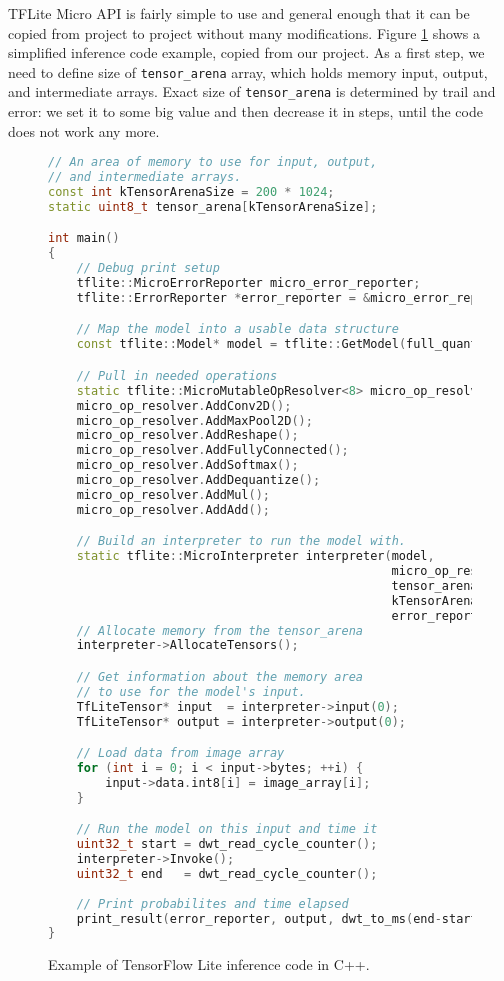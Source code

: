 TFLite Micro API is fairly simple to use and general enough that it can be copied from project to project without many modifications.
Figure \ref{inference_code} shows a simplified inference code example, copied from our project.
As a first step, we need to define size of \verb|tensor_arena| array, which holds memory input, output, and intermediate arrays.
Exact size of \verb|tensor_arena| is determined by trail and error: we set it to some big value and then decrease it in steps, until the code does not work any more.
\clearpage
\lstset{style=mystyle}
\begin{figure}[ht] 
    \begin{lstlisting}[language=C++]
// An area of memory to use for input, output, 
// and intermediate arrays.
const int kTensorArenaSize = 200 * 1024;
static uint8_t tensor_arena[kTensorArenaSize];

int main() 
{
    // Debug print setup
    tflite::MicroErrorReporter micro_error_reporter;
    tflite::ErrorReporter *error_reporter = &micro_error_reporter;

    // Map the model into a usable data structure
    const tflite::Model* model = tflite::GetModel(full_quant_tflite);

    // Pull in needed operations
    static tflite::MicroMutableOpResolver<8> micro_op_resolver;
    micro_op_resolver.AddConv2D();
    micro_op_resolver.AddMaxPool2D();
    micro_op_resolver.AddReshape();
    micro_op_resolver.AddFullyConnected();
    micro_op_resolver.AddSoftmax();
    micro_op_resolver.AddDequantize();
    micro_op_resolver.AddMul();
    micro_op_resolver.AddAdd();

    // Build an interpreter to run the model with.
    static tflite::MicroInterpreter interpreter(model, 
                                                micro_op_resolver, 
                                                tensor_arena,
                                                kTensorArenaSize, 
                                                error_reporter);
    // Allocate memory from the tensor_arena
    interpreter->AllocateTensors();

    // Get information about the memory area 
    // to use for the model's input.
    TfLiteTensor* input  = interpreter->input(0);
    TfLiteTensor* output = interpreter->output(0);

    // Load data from image array
    for (int i = 0; i < input->bytes; ++i) {
        input->data.int8[i] = image_array[i];
    }

    // Run the model on this input and time it
    uint32_t start = dwt_read_cycle_counter();
    interpreter->Invoke();
    uint32_t end   = dwt_read_cycle_counter();
    
    // Print probabilites and time elapsed
    print_result(error_reporter, output, dwt_to_ms(end-start));
}
    \end{lstlisting}
    \caption{ Example of TensorFlow Lite inference code in C++.}
    \label{inference_code}
\end{figure}
\clearpage

